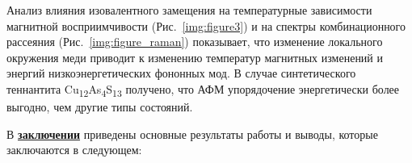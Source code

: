 Анализ влияния изовалентного замещения на температурные зависимости магнитной восприимчивости (Рис.~\ref{img:figure3}) и на спектры комбинационного рассеяния (Рис.~\ref{img:figure_raman}) показывает, что изменение локального окружения меди приводит к изменению температур магнитных изменений и энергий низкоэнергетических фононных мод. В случае синтетического теннантита Cu\textsubscript{12}As\textsubscript{4}S\textsubscript{13} получено, что АФМ упорядочение энергетически более выгодно, чем другие типы состояний.

В \underline{\textbf{заключении}} приведены основные результаты работы и выводы, которые заключаются в следующем:





